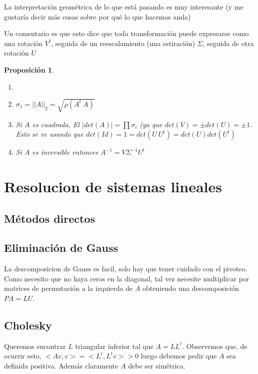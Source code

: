 \documentclass[10pt,a4paper,final]{report}
\newtheorem{proposition}{Proposición}
\begin{document}
La interpretación geométrica de lo que está pasando es muy interesante (y me gustaría decir más cosas sobre por qué lo que hacemos anda)

Un comentario es que esto dice que toda transformación puede expresarse como una rotación $V^t$, seguida de un reescalamiento (una estiración) $\Sigma$, seguida de otra rotación $U$

\begin{proposition}


\begin{enumerate}
	\item[]	 %
	\item $\sigma_1 = ||A||_2 = \sqrt{\rho(A^t\ A)}$
	\item Si $A$ es cuadrada, El $|det(A)| = \displaystyle \prod \sigma_i$ (ya que $det(V) = \pm det(U) = \pm 1$. Esto se ve usando que $det(Id) = 1 = det(U\ U^t) = det(U) det(U^t)$
	\item Si $A$ es inversible entonces $A^{-1} = V \Sigma^{-1} U^t$
\end{enumerate}

\end{proposition}



\section{Resolucion de sistemas lineales}

\subsection{Métodos directos}


\subsection*{Eliminación de Gauss}
La descomposicion de Gauss es facil, solo hay que tener cuidado con el pivoteo. Como necesito que no haya ceros en la diagonal, tal vez necesite multiplicar por matrices de permutación a la izquierda de $A$ obteniendo una descomposición $PA = LU$.




\subsection*{Cholesky}

Queremos encontrar $L$ triangular inferior tal que $A = L L^t$. Observemos que, de ocurrir esto, $<Av,v> = <L^t,L^tv> > 0$ luego debemos pedir que $A$ sea definida positiva. Además claramente $A$ debe ser simétrica.
\end{document}
